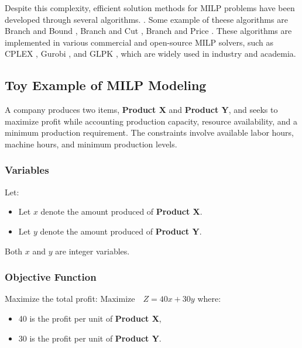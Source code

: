 Despite this complexity, efficient solution methods for MILP problems have been developed through several algorithms. . Some example of theese algorithms are
Branch and Bound \cite{land1960branch}, Branch and Cut \cite{padberg1991branch}, Branch and Price \cite{barnhart1998branch}.
These algorithms are implemented in various commercial and open-source MILP solvers, such as CPLEX \cite{studio2016ibm}, Gurobi \cite{gurobi2021gurobi}, and GLPK \cite{makhorin2008glpk}, which are widely used in industry and academia.

\subsection{Toy Example of MILP Modeling}

A company produces two items, \textbf{Product X} and \textbf{Product Y}, and seeks to maximize profit while accounting production capacity, resource availability, and a minimum production requirement. The constraints involve available labor hours, machine hours, and minimum production levels.

\subsubsection{Variables}
Let:
\begin{itemize}
    \item Let $x$ denote the amount produced of \textbf{Product X}.
    \item Let $y$ denote the amount produced of \textbf{Product Y}.
\end{itemize}


Both $x$ and $y$ are integer variables.

\subsubsection{Objective Function}
Maximize the total profit:
$
\text{Maximize} \quad Z = 40x + 30y
$
where:
\begin{itemize}
    \item 40 is the profit per unit of \textbf{Product X},
    \item 30 is the profit per unit of \textbf{Product Y}.
\end{itemize}

